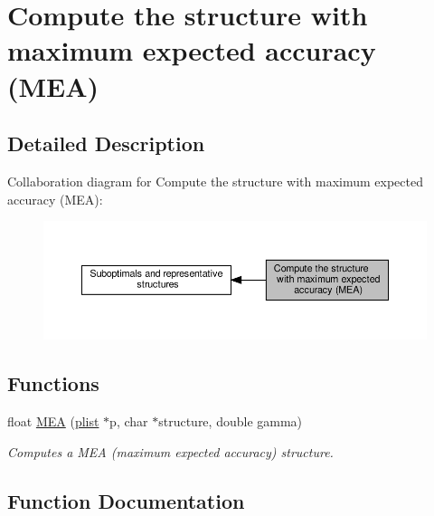 \hypertarget{group__mea__fold}{}\section{Compute the structure with maximum expected accuracy (M\+EA)}
\label{group__mea__fold}


\subsection{Detailed Description}
Collaboration diagram for Compute the structure with maximum expected accuracy (M\+EA)\+:
\nopagebreak
\begin{figure}[H]
\begin{center}
\leavevmode
\includegraphics[width=350pt]{group__mea__fold}
\end{center}
\end{figure}
\subsection*{Functions}
\begin{DoxyCompactItemize}
\item 
float \hyperlink{group__mea__fold_ga396ec6144c6a74fcbab4cea6b42d76c3}{M\+EA} (\hyperlink{group__data__structures_ga9608eed021ebfbdd7a901cfdc446c8e9}{plist} $\ast$p, char $\ast$structure, double gamma)
\begin{DoxyCompactList}\small\item\em Computes a M\+EA (maximum expected accuracy) structure. \end{DoxyCompactList}\end{DoxyCompactItemize}


\subsection{Function Documentation}
\mbox{\label{group__mea__fold_ga396ec6144c6a74fcbab4cea6b42d76c3}} 
